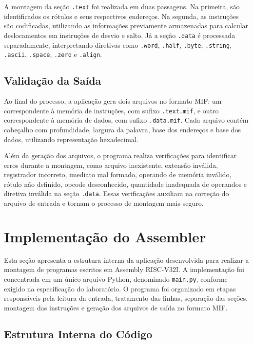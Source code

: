 \documentclass[conference]{IEEEtran}
\begin{document}
A montagem da seção \texttt{.text} foi realizada em duas passagens. Na primeira, são identificados os rótulos e seus respectivos endereços. Na segunda, as instruções são codificadas, utilizando as informações previamente armazenadas para calcular deslocamentos em instruções de desvio e salto. Já a seção \texttt{.data} é processada separadamente, interpretando diretivas como \texttt{.word}, \texttt{.half}, \texttt{.byte}, \texttt{.string}, \texttt{.ascii}, \texttt{.space}, \texttt{.zero} e \texttt{.align}.

\subsection{Validação da Saída}

Ao final do processo, a aplicação gera dois arquivos no formato MIF: um correspondente à memória de instruções, com sufixo \texttt{.text.mif}, e outro correspondente à memória de dados, com sufixo \texttt{.data.mif}. Cada arquivo contém cabeçalho com profundidade, largura da palavra, base dos endereços e base dos dados, utilizando representação hexadecimal.

Além da geração dos arquivos, o programa realiza verificações para identificar erros durante a montagem, como arquivo inexistente, extensão inválida, registrador incorreto, imediato mal formado, operando de memória inválido, rótulo não definido, opcode desconhecido, quantidade inadequada de operandos e diretiva inválida na seção \texttt{.data}. Essas verificações auxiliam na correção do arquivo de entrada e tornam o processo de montagem mais seguro.

\section{Implementação do Assembler}

Esta seção apresenta a estrutura interna da aplicação desenvolvida para realizar a montagem de programas escritos em Assembly RISC-V32I. A implementação foi concentrada em um único arquivo Python, denominado \texttt{main.py}, conforme exigido na especificação do laboratório. O programa foi organizado em etapas responsáveis pela leitura da entrada, tratamento das linhas, separação das seções, montagem das instruções e geração dos arquivos de saída no formato MIF.

\subsection{Estrutura Interna do Código}
\end{document}

